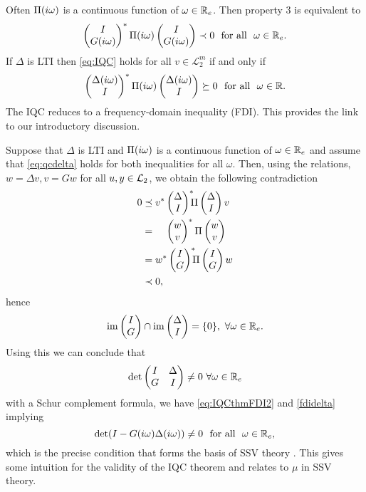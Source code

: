 \begin{rem}\label{remiqc2}
Often $\Pi(i\omega)$ is a continuous function of $\omega\in\mathbb{R}_e$. Then property 3 is equivalent to
\begin{equation}
\begin{pmatrix}I\\G(i\omega)\end{pmatrix}^*\Pi(i\omega)\begin{pmatrix}I\\G(i\omega)\end{pmatrix} \prec 0
\text{\ \ for all\ \ }\omega\in\mathbb{R}_e.
\label{eq:IQCthmFDI2}
\end{equation}
If $\Delta$ is LTI then \eqref{eq:IQC} holds for all $v\in\mathcal{L}^m_2$ if and only if
\begin{equation}
\begin{pmatrix}\Delta(i\omega)\\I\end{pmatrix}^*\Pi(i\omega)\begin{pmatrix}\Delta(i\omega)\\I\end{pmatrix} \succeq 0
\text{\ \ for all\ \ }\omega\in\mathbb{R}.
\label{fdidelta}
\end{equation}
The IQC reduces to a frequency-domain inequality (FDI). This provides the link to our introductory discussion.

Suppose that $\Delta$ is LTI and $\Pi(i\omega)$ is a continuous function of $\omega\in\mathbb{R}_e$ and assume that 
\eqref{eq:qcdelta} holds for both inequalities for all $\omega$. Then, using the relations, $w=\Delta v,v=G 
w$ for all $u,y\in\mathcal{L}_2$, we obtain the following contradiction
\begin{align}
0 &\preceq v^*\begin{pmatrix}\Delta\\I\end{pmatrix}^*\!\!\!\Pi\begin{pmatrix}\Delta\\I\end{pmatrix}v\\ &=\phantom{v^*}\begin{pmatrix}w\\v\end{pmatrix}^*\Pi\begin{pmatrix}w\\v\end{pmatrix}\\
&=w^*\begin{pmatrix}I\\G\end{pmatrix}^*\!\!\!\Pi\begin{pmatrix}I\\G\end{pmatrix}w \\&\prec 0, 
\end{align}
hence
\[
\operatorname{im}\begin{pmatrix}I\\G\end{pmatrix} \cap \operatorname{im}\begin{pmatrix}\Delta \\ I\end{pmatrix} =\{0\} ,\ \forall \omega\in\mathbb{R}_e.
\]
Using this we can conclude that 
\[
\det\pmatr{I &\Delta\\G &I}\neq 0\ \forall \omega\in\Realext
\] 
with a Schur complement formula, we have \eqref{eq:IQCthmFDI2} and \eqref{fdidelta} implying
\begin{equation}
\det(I-G(\iw)\Delta(\iw))\neq 0\text{\ \ for all\ \ }\omega\in\Realext,
\end{equation}
which is the precise condition that forms the basis of SSV theory \cite{packdoyle}. This gives some 
intuition for the validity of the IQC theorem and relates to $\mu$ in SSV theory. 
\end{rem}


